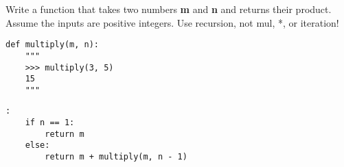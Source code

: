 \begin{blocksection}
\question Write a function that takes two numbers \textbf{m} and \textbf{n} and returns their product.
Assume the inputs are positive integers. Use recursion, not mul, *, or iteration!

\begin{lstlisting}
def multiply(m, n):
    """
    >>> multiply(3, 5)
    15
    """
\end{lstlisting}

\begin{solution}[1in]
\begin{lstlisting}:
    if n == 1:
        return m
    else:
        return m + multiply(m, n - 1)
\end{lstlisting}
\end{solution}
\end{blocksection}
